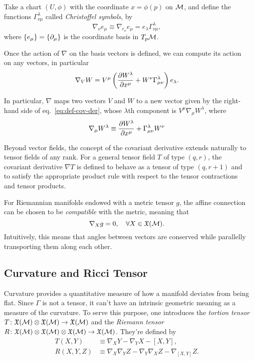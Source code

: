 Take a chart $(U, \phi)$ with the coordinate $x = \phi(p)$ on $\mathcal{M}$, and define the functions $\Gamma^\lambda_{\nu\mu}$ called \emph{Christoffel symbols}, by
\begin{equation}
    \nabla_\nu e_\mu \equiv \nabla_{e_\nu} e_\mu = e_\lambda \Gamma^\lambda_{\nu\mu},
\end{equation}
where $\{e_\mu\} = \{\partial_\mu\}$ is the coordinate basis in $T_p \mathcal{M}$.

Once the action of $\nabla$ on the basis vectors is defined, we can compute its action on any vectors, in particular
\begin{equation}\label{eq:def-cov-der}
    \nabla_V W = V^\mu \left( \frac{\partial W^\lambda}{\partial x^\mu} + W^\nu \Gamma^\lambda_{\mu\nu} \right) e_\lambda .
\end{equation}

In particular, $\nabla$ maps two vectors $V$ and $W$ to a new vector given by the right-hand side of eq.~\eqref{eq:def-cov-der}, whose $\lambda$th component is $V^\mu \nabla_\mu W^\lambda$, where
\begin{equation}
    \nabla_\mu W^\lambda \equiv \frac{\partial W^\lambda}{\partial x^\mu} + \Gamma^\lambda_{\mu\nu} W^\nu
\end{equation}

Beyond vector fields, the concept of the covariant derivative extends naturally to tensor fields of any rank. For a general tensor field $T$ of type $(q, r)$, the covariant derivative $\nabla T$ is defined to behave as a tensor of type $(q, r+1)$ and to satisfy the appropriate product rule with respect to the tensor contractions and tensor products.

For Riemannian manifolds endowed with a metric tensor $g$, the affine connection can be chosen to be \emph{compatible} with the metric, meaning that
\begin{equation}
    \nabla_X g = 0, \quad \forall X \in \mathfrak{X}(\mathcal{M}).
\end{equation}
Intuitively, this means that angles between vectors are conserved while parallelly transporting them along each other.

\subsection{Curvature and Ricci Tensor}

Curvature provides a quantitative measure of how a manifold deviates from being flat. Since $\Gamma$ is not a tensor, it can't have an intrinsic geometric meaning as a measure of the curvature. To serve this purpose, one introduces the \emph{tortion tensor} $T \colon \mathfrak{X}(\mathcal{M}) \otimes \mathfrak{X}(\mathcal{M}) \to \mathfrak{X}(\mathcal{M}) $ and the \emph{Riemann tensor} $R \colon \mathfrak{X}(\mathcal{M}) \otimes \mathfrak{X}(\mathcal{M}) \otimes \mathfrak{X}(\mathcal{M}) \to \mathfrak{X}(\mathcal{M}) $. They're defined by
\begin{align}
    T(X, Y) &\equiv \nabla_X Y - \nabla_Y X - [X,Y], \\
    R(X,Y,Z) &\equiv \nabla_X \nabla_Y Z - \nabla_Y \nabla_X Z - \nabla_{[X,Y]} Z. \label{eq:def-riemann}
\end{align}

